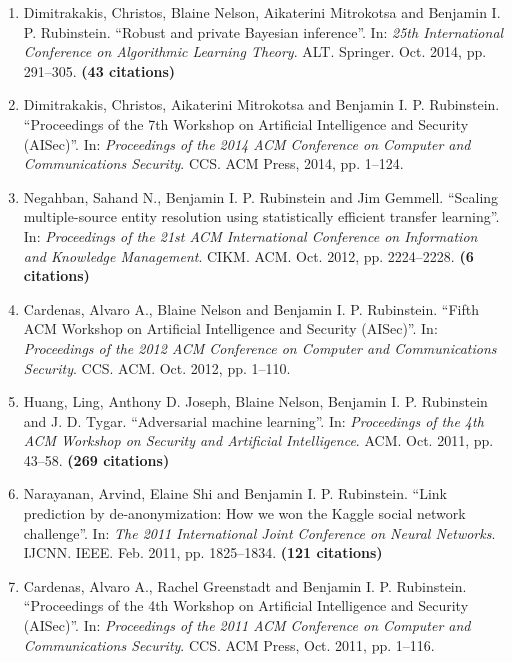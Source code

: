 \documentclass[a4paper,12pt]{article}
\begin{document}
\begin{enumerate}
\item Dimitrakakis, Christos, Blaine Nelson, Aikaterini Mitrokotsa and Benjamin I. P. Rubinstein.
``Robust and private Bayesian inference''.
In: 
\emph{25th International Conference on Algorithmic Learning Theory}.
ALT.
Springer.
Oct. 2014, pp. 291--305.
 \textbf{(43 citations)}
\item Dimitrakakis, Christos, Aikaterini Mitrokotsa and Benjamin I. P. Rubinstein.
``Proceedings of the 7th Workshop on Artificial Intelligence and Security (AISec)''.
In: 
\emph{Proceedings of the 2014 ACM Conference on Computer and Communications Security}.
CCS.
ACM Press, 2014, pp. 1--124.

\item Negahban, Sahand N., Benjamin I. P. Rubinstein and Jim Gemmell.
``Scaling multiple-source entity resolution using statistically efficient transfer learning''.
In: 
\emph{Proceedings of the 21st ACM International Conference on Information and Knowledge Management}.
CIKM.
ACM.
Oct. 2012, pp. 2224--2228.
 \textbf{(6 citations)}
\item Cardenas, Alvaro A., Blaine Nelson and Benjamin I. P. Rubinstein.
``Fifth ACM Workshop on Artificial Intelligence and Security (AISec)''.
In: 
\emph{Proceedings of the 2012 ACM Conference on Computer and Communications Security}.
CCS.
ACM.
Oct. 2012, pp. 1--110.

\item Huang, Ling, Anthony D. Joseph, Blaine Nelson, Benjamin I. P. Rubinstein and J. D. Tygar.
``Adversarial machine learning''.
In: 
\emph{Proceedings of the 4th ACM Workshop on Security and Artificial Intelligence}.
ACM.
Oct. 2011, pp. 43--58.
 \textbf{(269 citations)}
\item Narayanan, Arvind, Elaine Shi and Benjamin I. P. Rubinstein.
``Link prediction by de-anonymization: How we won the Kaggle social network challenge''.
In: 
\emph{The 2011 International Joint Conference on Neural Networks}.
IJCNN.
IEEE.
Feb. 2011, pp. 1825--1834.
 \textbf{(121 citations)}
\item Cardenas, Alvaro A., Rachel Greenstadt and Benjamin I. P. Rubinstein.
``Proceedings of the 4th Workshop on Artificial Intelligence and Security (AISec)''.
In: 
\emph{Proceedings of the 2011 ACM Conference on Computer and Communications Security}.
CCS.
ACM Press, Oct. 2011, pp. 1--116.


\end{enumerate}
\end{document}
